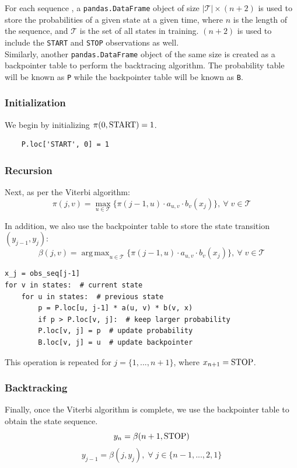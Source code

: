 \documentclass{article}
\DeclareMathOperator*{\argmax}{arg\,max}
\numberwithin{equation}{section}
\begin{document}
For each sequence , a \lstinline{pandas.DataFrame} object of size $\lvert\mathcal{T}\rvert \times (n+2)$ is used to store the probabilities of a given state at a given time, where $n$ is the length of the sequence, and $\mathcal{T}$ is the set of all states in training. $(n+2)$ is used to include the \lstinline{START} and \lstinline{STOP} observations as well.\\

Similarly, another \lstinline{pandas.DataFrame} object of the same size is created as a backpointer table to perform the backtracing algorithm. The probability table will be known as \lstinline{P} while the backpointer table will be known as \lstinline{B}.

\subsubsection{Initialization}
We begin by initializing $\pi(0, \text{\lstinline{START}}) = 1$.

\begin{verbatim}
    P.loc['START', 0] = 1
\end{verbatim}

\subsubsection{Recursion}
Next, as per the Viterbi algorithm:
	$$ \pi(j, v) = \max_{u\in\mathcal{T}} \{ \pi(j-1, u) \cdot a_{u, v} \cdot b_v(x_j) \}, \: \forall\; v \in \mathcal{T} $$

In addition, we also use the backpointer table to store the state transition $(y_{j-1}, y_j)$:
	$$\beta(j, v) = \argmax_{u\in\mathcal{T}} \{ \pi(j-1, u) \cdot a_{u, v} \cdot b_v(x_j) \}, \: \forall\; v \in \mathcal{T} $$

\begin{verbatim}
x_j = obs_seq[j-1]
for v in states:  # current state
    for u in states:  # previous state
        p = P.loc[u, j-1] * a(u, v) * b(v, x)
        if p > P.loc[v, j]:  # keep larger probability
        P.loc[v, j] = p  # update probability
        B.loc[v, j] = u  # update backpointer
\end{verbatim}

This operation is repeated for $j = \{1, ..., n+1\}$, where $x_{n+1} = \text{\lstinline{STOP}}$.

\subsubsection{Backtracking}
Finally, once the Viterbi algorithm is complete, we use the backpointer table to obtain the state sequence.
	$$ y_{n} = \beta(n+1, \text{\lstinline{STOP}}) $$
	$$ y_{j-1} = \beta(j, y_j),\; \forall\; j \in \{n-1, ..., 2, 1\} $$
\end{document}
